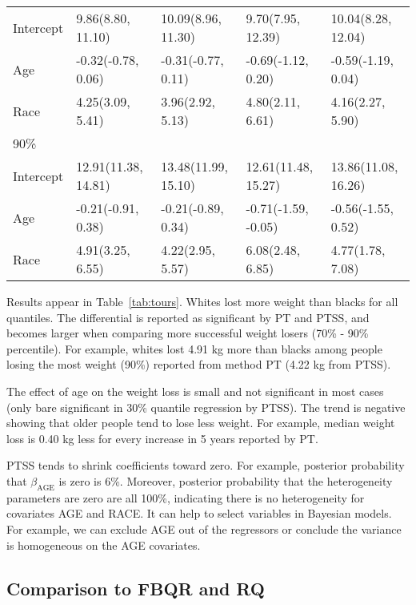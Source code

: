 \documentclass[12pt]{article}
\begin{document}
\begin{table}[h]
\begin{tabular}[tb]{l|l|l|l|l}
    Intercept & 9.86(8.80, 11.10)   & 10.09(8.96, 11.30) & 9.70(7.95, 12.39)   & 10.04(8.28, 12.04)   \\
    Age       & -0.32(-0.78, 0.06)  & -0.31(-0.77, 0.11) & -0.69(-1.12, 0.20)  & -0.59(-1.19, 0.04)   \\
    Race      & 4.25(3.09, 5.41)    & 3.96(2.92, 5.13)   & 4.80(2.11, 6.61)    & 4.16(2.27, 5.90)     \\
    \hline
    90\%      &                     &                    &                     &                      \\
    Intercept & 12.91(11.38, 14.81) & 13.48(11.99, 15.10)& 12.61(11.48, 15.27) & 13.86(11.08, 16.26)  \\
    Age       & -0.21(-0.91, 0.38)  & -0.21(-0.89, 0.34) & -0.71(-1.59, -0.05) & -0.56(-1.55, 0.52)   \\
    Race      & 4.91(3.25, 6.55)    & 4.22(2.95, 5.57)   & 6.08(2.48, 6.85)    & 4.77(1.78, 7.08)     \\
    \bottomrule
  \end{tabular}
\end{table}

Results appear in Table~\ref{tab:tours}.  Whites lost more weight than
blacks for all quantiles.  The differential is reported as significant
by PT and PTSS, and becomes larger when comparing more successful
weight losers (70\% - 90\% percentile). For example, whites lost 4.91
kg more than blacks among people losing the most weight (90\%)
reported from method PT (4.22 kg from PTSS).

The effect of age on the weight loss is small and not significant in
most cases (only bare significant in 30\% quantile regression by
PTSS).  The trend is negative showing that older people tend to lose
less weight. For example, median weight loss is 0.40 kg less for every
increase in 5 years reported by PT.

PTSS tends to shrink coefficients toward zero. For example, posterior
probability that $\beta_{\mbox{AGE}}$ is zero is 6\%.  Moreover,
posterior probability that the heterogeneity parameters are zero are
all 100\%, indicating there is no heterogeneity for covariates AGE and
RACE.  It can help to select variables in Bayesian models. For
example, we can exclude AGE out of the regressors or conclude the
variance is homogeneous on the AGE covariates.

\subsection{Comparison to FBQR and RQ}
\end{document}
